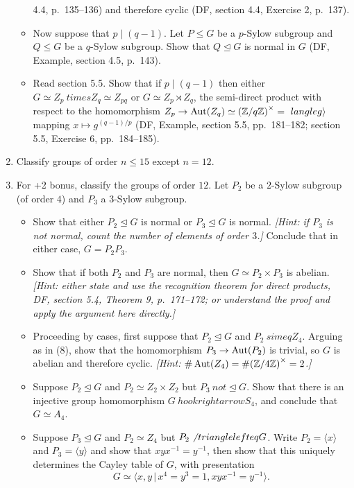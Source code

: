 \documentclass[11pt, reqno]{amsart}
\begin{document}
\begin{enumerate}
\begin{itemize}
4.4, p.~135--136)
and therefore cyclic (DF, section 4.4, Exercise 2, p.~137).  
\item Now suppose that $p \mid (q-1)$.  Let $P \leq G$ be a $p$-Sylow subgroup and 
$Q \leq G$ be a $q$-Sylow subgroup.  Show that $Q \trianglelefteq G$ is normal in 
$G$ (DF, Example, section 4.5, p.~143).
\item Read section 5.5.  Show that if $p \mid (q-1)$ then either $G \simeq Z_p \
times Z_q \simeq Z_{pq}$ or $G \simeq Z_p \rtimes Z_q$, the semi-direct product 
with respect to the homomorphism $Z_p \to \operatorname{Aut}(Z_q) \simeq {(\mathbb{Z}/q\mathbb{Z})}^\times = \
langle g \rangle$ mapping $x \mapsto g^{(q-1)/p}$ (DF, Example, section 5.5, 
pp.~181--182; section 5.5, Exercise 6, pp.~184--185).
\end{itemize}
\item Classify groups of order $n \leq 15$ except $n=12$.
\item For +2 bonus, classify the groups of order $12$.  Let $P_2$ be a $2$-Sylow 
subgroup (of order $4$) and $P_3$ a $3$-Sylow subgroup.  
\begin{itemize}
\item Show that either $P_2 \trianglelefteq G$ is normal or $P_3 \trianglelefteq G$
is normal. 
\emph{[Hint: if $P_3$ is not normal, count the number of elements of order $3$.]}  
Conclude that in either case, $G=P_2P_3$.
\item Show that if both $P_2$ and $P_3$ are normal, then $G \simeq P_2 \times P_3$ 
is abelian.  \emph{[Hint: either state and use the recognition theorem for direct 
products, DF, section 5.4, Theorem 9, p.~171--172; or understand the proof and 
apply the argument here directly.]}
\item Proceeding by cases, first suppose that $P_2 \trianglelefteq G$ and $P_2 \
simeq Z_4$.  Arguing as in (8), show that the homomorphism $P_3 \to \operatorname{Aut}(P_2)$ is 
trivial, so $G$ is abelian and therefore cyclic.  \emph{[Hint: 
$\#\operatorname{Aut}(Z_4)=\#{(\mathbb{Z}/4\mathbb{Z})}^\times=2$.]}
\item Suppose $P_2 \trianglelefteq G$ and $P_2 \simeq Z_2 \times Z_2$ but $P_3 \
not\trianglelefteq G$.  Show that there is an injective group homomorphism $G \
hookrightarrow S_4$, and conclude that $G \simeq A_4$.
\item Suppose $P_3 \trianglelefteq G$ and $P_2 \simeq Z_4$ but $P_2 \not\
trianglelefteq G$.  Write $P_2=\langle x \rangle$ and $P_3=\langle y \rangle$ and 
show that $xyx^{-1}=y^{-1}$, then show that this uniquely determines the Cayley 
table of $G$, with presentation
\[ G \simeq \langle x,y \,|\, x^4=y^3=1, xyx^{-1}=y^{-1} \rangle. \]

\end{itemize}
\end{enumerate}
\end{document}
